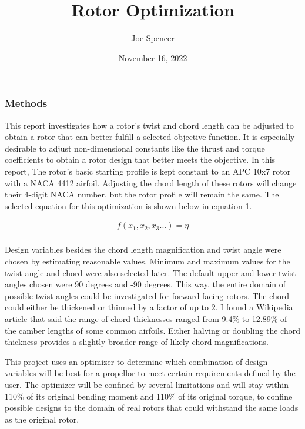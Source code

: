 \documentclass{article}
\begin{document}
\author{Joe Spencer}
\title{Rotor Optimization}
\date{November 16, 2022}
\maketitle

\subsubsection*{Methods}

This report investigates how a rotor's twist and chord length can be adjusted to obtain a rotor that can better fulfill a selected objective function. It is especially desirable to adjust non-dimensional constants like the thrust and torque coefficients to obtain a rotor design that better meets the objective. In this report, The rotor's basic starting profile is kept constant to an APC 10x7 rotor with a NACA 4412 airfoil. Adjusting the chord length of these rotors will change their 4-digit NACA number, but the rotor profile will remain the same. The selected equation for this optimization is shown below in equation 1. \newline

\begin{equation}
\begin{aligned}
	f(x_{1}, x_{2}, x_{3}...) = \eta \\
\end{aligned}
\end{equation} \newline

\noindent Design variables besides the chord length magnification and twist angle were chosen by estimating reasonable values. Minimum and maximum values for the twist angle and chord were also selected later. The default upper and lower twist angles chosen were 90 degrees and -90 degrees. This way, the entire domain of possible twist angles could be investigated for forward-facing rotors. The chord could either be thickened or thinned by a factor of up to 2. I found a \href{https://en.wikipedia.org/wiki/Thickness-to-chord_ratio}{Wikipedia article} that said the range of chord thicknesses ranged from 9.4\% to 12.89\% of the camber lengths of some common airfoils. Either halving or doubling the chord thickness provides a slightly broader range of likely chord magnifications. \newline

\noindent This project uses an optimizer to determine which combination of design variables will be best for a propellor to meet certain requirements defined by the user. The optimizer will be confined by several limitations and will stay within 110\% of its original bending moment and 110\% of its original torque, to confine possible designs to the domain of real rotors that could withstand the same loads as the original rotor. \newline
\end{document}

